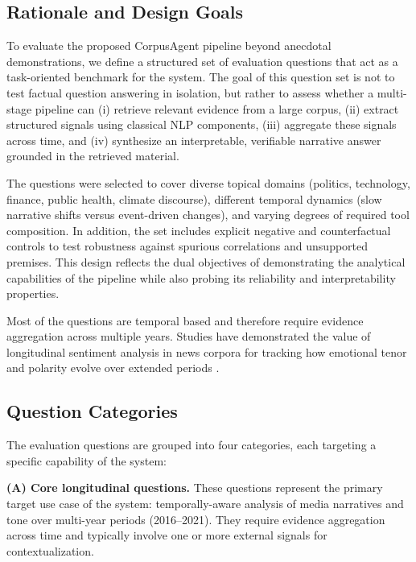 \subsection{Rationale and Design Goals}

To evaluate the proposed CorpusAgent pipeline beyond anecdotal demonstrations, we define a structured set of evaluation questions that act as a task-oriented benchmark for the system. The goal of this question set is not to test factual question answering in isolation, but rather to assess whether a multi-stage pipeline can (i) retrieve relevant evidence from a large corpus, (ii) extract structured signals using classical NLP components, (iii) aggregate these signals across time, and (iv) synthesize an interpretable, verifiable narrative answer grounded in the retrieved material.

The questions were selected to cover diverse topical domains (politics, technology, finance, public health, climate discourse), different temporal dynamics (slow narrative shifts versus event-driven changes), and varying degrees of required tool composition. In addition, the set includes explicit negative and counterfactual controls to test robustness against spurious correlations and unsupported premises. This design reflects the dual objectives of demonstrating the analytical capabilities of the pipeline while also probing its reliability and interpretability properties.

Most of the questions are temporal based and therefore require evidence aggregation across multiple years. Studies have demonstrated the value of longitudinal sentiment analysis in news corpora for tracking how emotional tenor and polarity evolve over extended periods \cite{10.1371/journal.pone.0276367}.

\subsection{Question Categories}

The evaluation questions are grouped into four categories, each targeting a specific capability of the system:

\textbf{(A) Core longitudinal questions.}
These questions represent the primary target use case of the system: temporally-aware analysis of media narratives and tone over multi-year periods (2016--2021). They require evidence aggregation across time and typically involve one or more external signals for contextualization.

